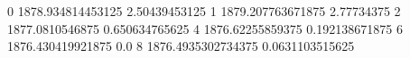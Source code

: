 0 1878.934814453125 2.50439453125
1 1879.207763671875 2.77734375
2 1877.0810546875 0.650634765625
4 1876.62255859375 0.192138671875
6 1876.430419921875 0.0
8 1876.4935302734375 0.0631103515625
